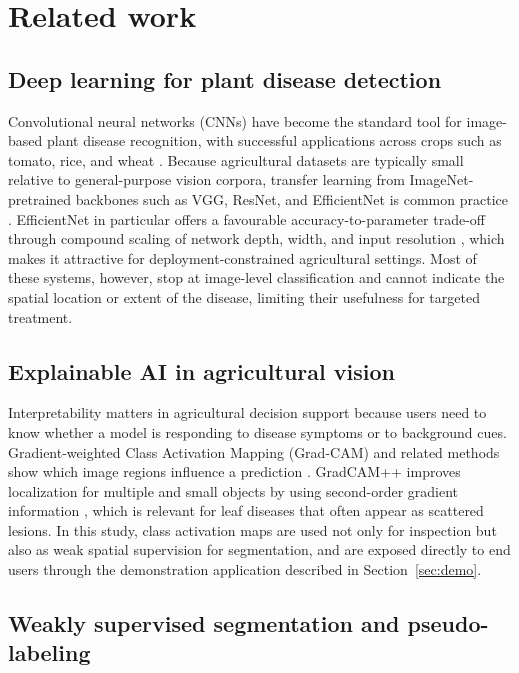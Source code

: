 \documentclass[final,5p,times,twocolumn,authoryear]{elsarticle}
\begin{document}
\section{Related work}
\label{sec:related}

\subsection{Deep learning for plant disease detection}

Convolutional neural networks (CNNs) have become the standard tool for image-based plant disease recognition, with successful applications across crops such as tomato, rice, and wheat \citep{mohanty2016using, ferentinos2018deep}. Because agricultural datasets are typically small relative to general-purpose vision corpora, transfer learning from ImageNet-pretrained backbones such as VGG, ResNet, and EfficientNet is common practice \citep{deng2009imagenet, tan2019efficientnet}. EfficientNet in particular offers a favourable accuracy-to-parameter trade-off through compound scaling of network depth, width, and input resolution \citep{tan2019efficientnet}, which makes it attractive for deployment-constrained agricultural settings. Most of these systems, however, stop at image-level classification and cannot indicate the spatial location or extent of the disease, limiting their usefulness for targeted treatment.

\subsection{Explainable AI in agricultural vision}

Interpretability matters in agricultural decision support because users need to know whether a model is responding to disease symptoms or to background cues. Gradient-weighted Class Activation Mapping (Grad-CAM) and related methods show which image regions influence a prediction \citep{selvaraju2017grad}. GradCAM++ improves localization for multiple and small objects by using second-order gradient information \citep{chattopadhay2018grad}, which is relevant for leaf diseases that often appear as scattered lesions. In this study, class activation maps are used not only for inspection but also as weak spatial supervision for segmentation, and are exposed directly to end users through the demonstration application described in Section~\ref{sec:demo}.

\subsection{Weakly supervised segmentation and pseudo-labeling}
\end{document}
